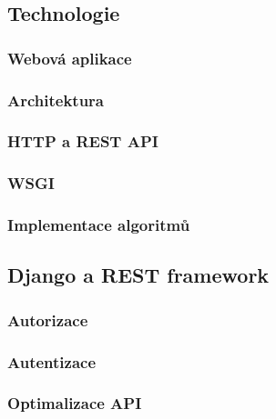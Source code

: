 \documentclass[a4paper,11pt,titlepage,fleqn]{article}
\begin{document}
    \subsection{Technologie}
        \subsubsection{Webová aplikace}

        \subsubsection{Architektura}

        \subsubsection{HTTP a REST API}

        \subsubsection{WSGI}

        \subsubsection{Implementace algoritmů}

    \subsection{Django a REST framework}
        
        \subsubsection{Autorizace}

        \subsubsection{Autentizace}

        \subsubsection{Optimalizace API}
\end{document}
